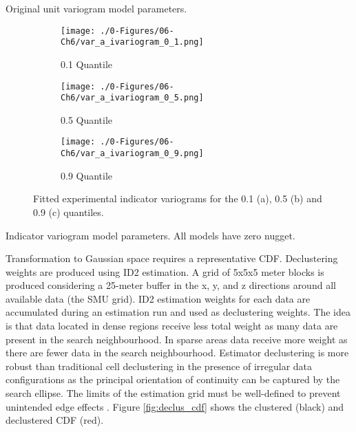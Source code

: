\begin{table}[!htb]
    \centering
    \caption{Original unit variogram model parameters.}
    \resizebox{1\width}{!}{}
    \label{tab:orig_expvar}
\end{table}

\begin{figure}
    \begin{subfigure}{1.0\textwidth}
        \centering
        \texttt{[image: ./0-Figures/06-Ch6/var\_a\_ivariogram\_0\_1.png]}
        \caption{0.1 Quantile}
    \end{subfigure}
    \begin{subfigure}{1.0\textwidth}
        \centering
        \texttt{[image: ./0-Figures/06-Ch6/var\_a\_ivariogram\_0\_5.png]}
        \caption{0.5 Quantile}
    \end{subfigure}
    \begin{subfigure}{1.0\textwidth}
        \centering
        \texttt{[image: ./0-Figures/06-Ch6/var\_a\_ivariogram\_0\_9.png]}
        \caption{0.9 Quantile}
    \end{subfigure}
    \caption{Fitted experimental indicator variograms for the 0.1 (a), 0.5 (b) and 0.9 (c) quantiles.}
    \label{fig:ind_expvar}
\end{figure}

\begin{table}[!htb]
    \centering
    \caption{Indicator variogram model parameters. All models have zero nugget.}
    \resizebox{0.9\width}{!}{}
    \label{tab:ind_expvar}
\end{table}

Transformation to Gaussian space requires a representative \gls{CDF}. Declustering weights are produced using \gls{ID2} estimation. A grid of 5x5x5 meter blocks is produced considering a 25-meter buffer in the x, y, and z directions around all available data (the \gls{SMU} grid). \Gls{ID2} estimation weights for each data are accumulated during an estimation run and used as declustering weights. The idea is that data located in dense regions receive less total weight as many data are present in the search neighbourhood. In sparse areas data receive more weight as there are fewer data in the search neighbourhood. Estimator declustering is more robust than traditional cell declustering in the presence of irregular data configurations as the principal orientation of continuity can be captured by the search ellipse. The limits of the estimation grid must be well-defined to prevent unintended edge effects \cite{Wilde2007}. Figure \ref{fig:declus_cdf} shows the clustered (black) and declustered \gls{CDF} (red).

